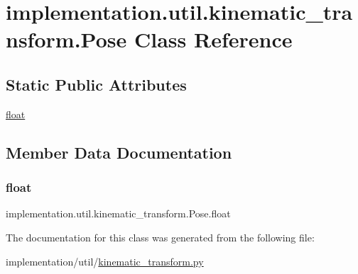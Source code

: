 \hypertarget{classimplementation_1_1util_1_1kinematic__transform_1_1_pose}{}\section{implementation.\+util.\+kinematic\+\_\+transform.\+Pose Class Reference}
\label{classimplementation_1_1util_1_1kinematic__transform_1_1_pose}
\subsection*{Static Public Attributes}
\begin{DoxyCompactItemize}
\item 
\hyperlink{classimplementation_1_1util_1_1kinematic__transform_1_1_pose_afc2edf1ce8150514645a31bc242f5d2b}{float}
\end{DoxyCompactItemize}


\subsection{Member Data Documentation}
\mbox{\label{classimplementation_1_1util_1_1kinematic__transform_1_1_pose_afc2edf1ce8150514645a31bc242f5d2b}} 
\subsubsection{\texorpdfstring{float}{float}}
{\footnotesize\ttfamily implementation.\+util.\+kinematic\+\_\+transform.\+Pose.\+float\hspace{0.3cm}{\ttfamily [static]}}



The documentation for this class was generated from the following file\+:\begin{DoxyCompactItemize}
\item 
implementation/util/\hyperlink{kinematic__transform_8py}{kinematic\+\_\+transform.\+py}\end{DoxyCompactItemize}
